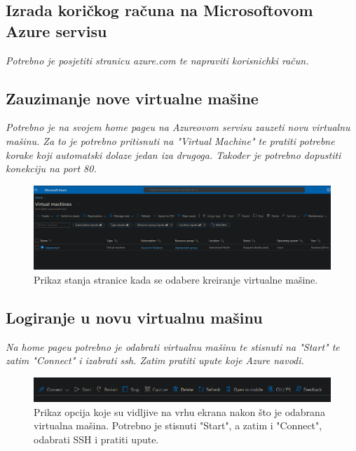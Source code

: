     \subsection{Izrada koričkog računa na Microsoftovom Azure servisu}
    \textit{Potrebno je posjetiti stranicu azure.com te napraviti korisnichki račun.}

    \subsection{Zauzimanje nove virtualne mašine}
    \textit{Potrebno je na svojem home pageu na Azureovom servisu zauzeti novu virtualnu mašinu. Za to je potrebno pritisnuti na "Virtual Machine" te pratiti potrebne korake koji automatski dolaze jedan iza drugoga. Također je potrebno dopustiti konekciju na port 80.}
    \begin{figure}[H]
        \includegraphics[width=\textwidth]{slike/deploy/create_vm.png} %
        \caption{Prikaz stanja stranice kada se odabere kreiranje virtualne mašine.}
        \label{fig:struktura} %
    \end{figure}

    \subsection{Logiranje u novu virtualnu mašinu}
    \textit{Na home pageu potrebno je odabrati virtualnu mašinu te stisnuti na "Start" te zatim "Connect" i izabrati ssh. Zatim pratiti upute koje Azure navodi.}
    \begin{figure}[H]
        \includegraphics[width=\textwidth]{slike/deploy/connect.png} %
        \caption{Prikaz opcija koje su vidljive na vrhu ekrana nakon što je odabrana virtualna mašina. Potrebno je stisnuti "Start", a zatim i "Connect", odabrati SSH i pratiti upute.}
        \label{fig:struktura} %
    \end{figure}

